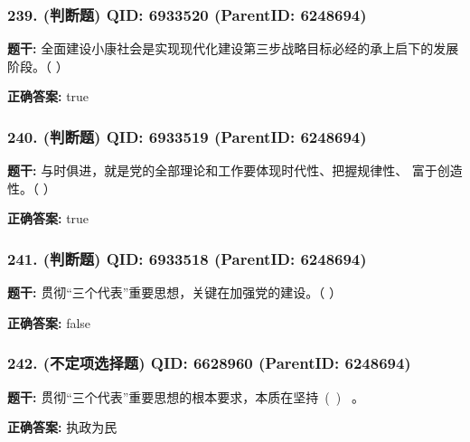 \documentclass[12pt,UTF8]{ctexart}
\begin{document}
\subsubsection*{239. (判断题) \small QID: 6933520 (ParentID: 6248694)}

\textbf{题干:}
全面建设小康社会是实现现代化建设第三步战略目标必经的承上启下的发展阶段。（ ）



\textbf{正确答案:}
true

\vspace{0.3em}\hrulefill\vspace{0.7em}

\subsubsection*{240. (判断题) \small QID: 6933519 (ParentID: 6248694)}

\textbf{题干:}
与时俱进，就是党的全部理论和工作要体现时代性、把握规律性、 富于创造性。（ ）



\textbf{正确答案:}
true

\vspace{0.3em}\hrulefill\vspace{0.7em}

\subsubsection*{241. (判断题) \small QID: 6933518 (ParentID: 6248694)}

\textbf{题干:}
贯彻“三个代表”重要思想，关键在加强党的建设。（ ）



\textbf{正确答案:}
false

\vspace{0.3em}\hrulefill\vspace{0.7em}

\subsubsection*{242. (不定项选择题) \small QID: 6628960 (ParentID: 6248694)}

\textbf{题干:}
贯彻“三个代表”重要思想的根本要求，本质在坚持 ( )  。



\textbf{正确答案:}
执政为民

\vspace{0.3em}\hrulefill\vspace{0.7em}
\end{document}
